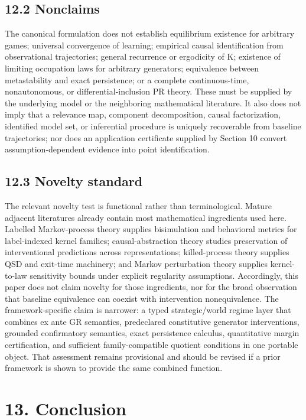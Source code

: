 \documentclass[10pt]{article}
\begin{document}
\subsection{12.2 Nonclaims}\label{nonclaims}

The canonical formulation does not establish equilibrium existence for
arbitrary games; universal convergence of learning; empirical causal
identification from observational trajectories; general recurrence or
ergodicity of K; existence of limiting occupation laws for arbitrary
generators; equivalence between metastability and exact persistence; or
a complete continuous-time, nonautonomous, or
differential-inclusion PR theory. These must be supplied by the
underlying model or the neighboring mathematical literature. It also
does not imply that a relevance map, component decomposition, causal
factorization, identified model set, or inferential procedure is
uniquely recoverable from baseline trajectories; nor does an application
certificate supplied by Section 10 convert assumption-dependent evidence
into point identification.

\subsection{12.3 Novelty standard}\label{novelty-standard}
The relevant novelty test is functional rather than terminological. Mature adjacent literatures already contain most mathematical ingredients used here. Labelled Markov-process theory supplies bisimulation and behavioral metrics for label-indexed kernel families; causal-abstraction theory studies preservation of interventional predictions across representations; killed-process theory supplies QSD and exit-time machinery; and Markov perturbation theory supplies kernel-to-law sensitivity bounds under explicit regularity assumptions. Accordingly, this paper does not claim novelty for those ingredients, nor for the broad observation that baseline equivalence can coexist with intervention nonequivalence. The framework-specific claim is narrower: a typed strategic/world regime layer that combines ex ante GR semantics, predeclared constitutive generator interventions, grounded confirmatory semantics, exact persistence calculus, quantitative margin certification, and sufficient family-compatible quotient conditions in one portable object. That assessment remains provisional and should be revised if a prior framework is shown to provide the same combined function.

\section{13. Conclusion}\label{conclusion}
\end{document}
